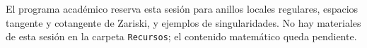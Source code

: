 \begin{nota}
El programa académico reserva esta sesión para anillos locales regulares, espacios tangente y cotangente de Zariski, y ejemplos de singularidades. No hay materiales de esta sesión en la carpeta \texttt{Recursos}; el contenido matemático queda pendiente.
\end{nota}
